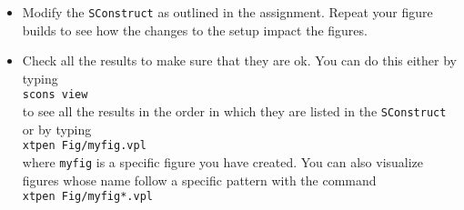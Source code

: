 {{\begin{itemize}
      you would like to build an individual figure called
      \texttt{myfig}, run \\
      \texttt{scons myfig.view} 
    \item Modify the \texttt{SConstruct} as outlined in the
      assignment. Repeat your figure builds to see how the changes to
      the setup impact the figures.
    \item Check all the results to make sure that they are ok. You can
      do this either by typing \\
      \texttt{scons view} \\
      to see all the results in the order in which they are listed in the
      \texttt{SConstruct} or by typing \\
      \texttt{xtpen Fig/myfig.vpl} \\
      where \texttt{myfig} is a specific figure you have created. You can
      also visualize figures whose name follow a specific pattern with the
      command \\
      \texttt{xtpen Fig/myfig*.vpl}
    \end{itemize}
  }
}
